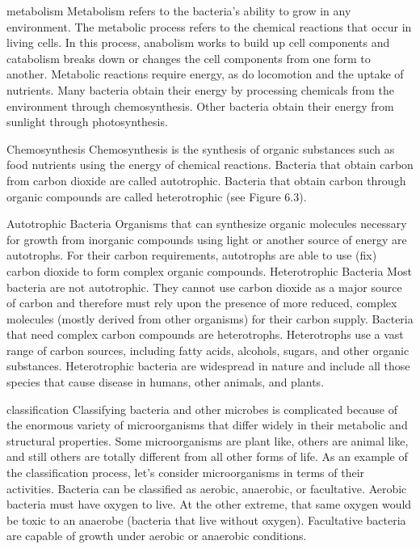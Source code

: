 \documentclass{article}
\begin{document}
metabolism Metabolism refers to the bacteria's ability to grow in any
environment. The metabolic process refers to the chemical reactions that
occur in living cells. In this process, anabolism works to build up cell
components and catabolism breaks down or changes the cell components
from one form to another. Metabolic reactions require energy, as do
locomotion and the uptake of nutrients. Many bacteria obtain their
energy by processing chemicals from the environment through
chemosynthesis. Other bacteria obtain their energy from sunlight through
photosynthesis.

Chemosynthesis Chemosynthesis is the synthesis of organic substances
such as food nutrients using the energy of chemical reactions. Bacteria
that obtain carbon from carbon dioxide are called autotrophic. Bacteria
that obtain carbon through organic compounds are called heterotrophic
(see Figure 6.3).

Autotrophic Bacteria Organisms that can synthesize organic molecules
necessary for growth from inorganic compounds using light or another
source of energy are autotrophs. For their carbon requirements,
autotrophs are able to use (fix) carbon dioxide to form complex organic
compounds. Heterotrophic Bacteria Most bacteria are not autotrophic.
They cannot use carbon dioxide as a major source of carbon and therefore
must rely upon the presence of more reduced, complex molecules (mostly
derived from other organisms) for their carbon supply. Bacteria that
need complex carbon compounds are heterotrophs. Heterotrophs use a vast
range of carbon sources, including fatty acids, alcohols, sugars, and
other organic substances. Heterotrophic bacteria are widespread in
nature and include all those species that cause disease in humans, other
animals, and plants.

classification Classifying bacteria and other microbes is complicated
because of the enormous variety of microorganisms that differ widely in
their metabolic and structural properties. Some microorganisms are plant
like, others are animal like, and still others are totally different
from all other forms of life. As an example of the classification
process, let's consider microorganisms in terms of their activities.
Bacteria can be classified as aerobic, anaerobic, or facultative.
Aerobic bacteria must have oxygen to live. At the other extreme, that
same oxygen would be toxic to an anaerobe (bacteria that live without
oxygen). Facultative bacteria are capable of growth under aerobic or
anaerobic conditions.
\end{document}
